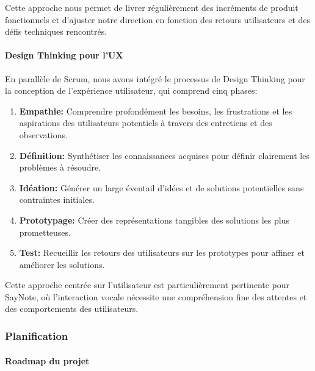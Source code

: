     Cette approche nous permet de livrer régulièrement des incréments de produit fonctionnels et d'ajuster notre direction en fonction des retours utilisateurs et des défis techniques rencontrés.
    
    \paragraph{Design Thinking pour l'UX}
    
    En parallèle de Scrum, nous avons intégré le processus de Design Thinking pour la conception de l'expérience utilisateur, qui comprend cinq phases:
    
    \begin{enumerate}
        \item \textbf{Empathie:} Comprendre profondément les besoins, les frustrations et les aspirations des utilisateurs potentiels à travers des entretiens et des observations.
        
        \item \textbf{Définition:} Synthétiser les connaissances acquises pour définir clairement les problèmes à résoudre.
        
        \item \textbf{Idéation:} Générer un large éventail d'idées et de solutions potentielles sans contraintes initiales.
        
        \item \textbf{Prototypage:} Créer des représentations tangibles des solutions les plus prometteuses.
        
        \item \textbf{Test:} Recueillir les retours des utilisateurs sur les prototypes pour affiner et améliorer les solutions.
    \end{enumerate}
    
    Cette approche centrée sur l'utilisateur est particulièrement pertinente pour SayNote, où l'interaction vocale nécessite une compréhension fine des attentes et des comportements des utilisateurs.
    
        
    \subsubsection{Planification}
    
    \paragraph{Roadmap du projet}
    

